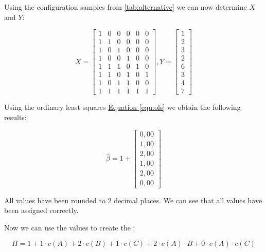 Using the configuration samples from \autoref{tab:alternative} we can now determine $\textit{X}$ and $\textit{Y}$:

\begin{displaymath}
    \textit{X} = 
    \begin{bmatrix} 
        1 & 0 & 0 & 0 & 0 & 0 \\
        1 & 1 & 0 & 0 & 0 & 0 \\
        1 & 0 & 1 & 0 & 0 & 0 \\
        1 & 0 & 0 & 1 & 0 & 0 \\
        1 & 1 & 1 & 0 & 1 & 0 \\
        1 & 1 & 0 & 1 & 0 & 1 \\
        1 & 0 & 1 & 1 & 0 & 0 \\
        1 & 1 & 1 & 1 & 1 & 1 
      \end{bmatrix}
      ,
      \textit{Y} =
      \begin{bmatrix}
        1 \\
        2 \\
        3 \\
        2 \\
        6 \\
        3 \\
        4 \\
        7 
      \end{bmatrix}
\end{displaymath}


Using the ordinary least squares \hyperref[equ:ols]{Equation \ref*{equ:ols}}  we obtain the following results:

\begin{equation}
    \hat{\beta} = 1 + 
    \begin{bmatrix}
        0,00 \\
        1,00 \\
        2,00 \\
        1,00 \\
        2,00 \\
        0,00
    \end{bmatrix}
\end{equation}

All values have been rounded to 2 decimal places. 
We can see that all values have been assigned correctly.

Now we can use the values to create the \perfInfluenceModel:

\begin{equation}
    \Pi = 1 + 1 \cdot c(A) + 2 \cdot c(B) + 1 \cdot c(C) + 2 \cdot c(A) \cdot B + 0 \cdot c(A) \cdot c(C)
\end{equation}

